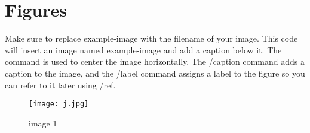 \documentclass{article}
\begin{document}
	\section{Figures}
	Make sure to replace example-image with the filename of your image.
	This code will insert an image named example-image and add a caption
	below it. The \centering command is used to center the image
	horizontally. The /caption command adds a caption to the image, and the
	/label command assigns a label to the figure so you can refer to it later
	using /ref{}.
	
	
	\begin{figure}
		\centering
		\texttt{[image: j.jpg]}
		\caption{image 1}
		\label{fig: example1}
	\end{figure}
\end{document}
